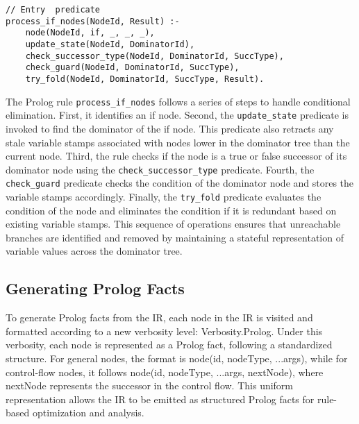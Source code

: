 \begin{lstlisting}
// Entry  predicate
process_if_nodes(NodeId, Result) :-
    node(NodeId, if, _, _, _),
    update_state(NodeId, DominatorId),
    check_successor_type(NodeId, DominatorId, SuccType),
    check_guard(NodeId, DominatorId, SuccType),
    try_fold(NodeId, DominatorId, SuccType, Result).
\end{lstlisting}

The Prolog rule \texttt{process_if_nodes} follows a series of steps to handle conditional elimination. First, it identifies an if node. Second, the \texttt{update_state} predicate is invoked to find the dominator of the if node. This predicate also retracts any stale variable stamps associated with nodes lower in the dominator tree than the current node. Third, the rule checks if the node is a true or false successor of its dominator node using the \texttt{check_successor_type} predicate. Fourth, the \texttt{check_guard} predicate checks the condition of the dominator node and stores the variable stamps accordingly. Finally, the \texttt{try_fold} predicate evaluates the condition of the node and eliminates the condition if it is redundant based on existing variable stamps. This sequence of operations ensures that unreachable branches are identified and removed by maintaining a stateful representation of variable values across the dominator tree.

\subsection{Generating Prolog Facts}
To generate Prolog facts from the IR, each node in the IR is visited and formatted according to a new verbosity level: Verbosity.Prolog. Under this verbosity, each node is represented as a Prolog fact, following a standardized structure. For general nodes, the format is node(id, nodeType, ...args), while for control-flow nodes, it follows node(id, nodeType, ...args, nextNode), where nextNode represents the successor in the control flow. This uniform representation allows the IR to be emitted as structured Prolog facts for rule-based optimization and analysis.

